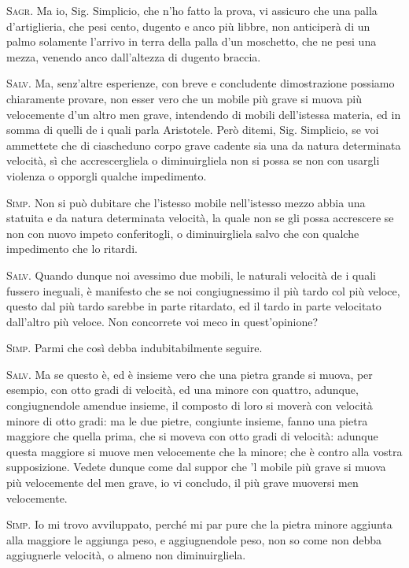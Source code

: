 \documentclass[11pt,twoside,openany]{book}
\newcommand{\speaker}[1]{\textcolor{rubric}{\textsc{#1}}\space}
\begin{document}
\speaker{Sagr.} Ma io, Sig. Simplicio, che n'ho fatto la prova, vi assicuro che una palla d'artiglieria, che pesi cento, dugento e anco più libbre, non anticiperà di un palmo solamente l'arrivo in terra della palla d'un moschetto, che ne pesi una mezza, venendo anco dall'altezza di dugento braccia.

\speaker{Salv.} Ma, senz'altre esperienze, con breve e concludente dimostrazione possiamo chiaramente provare, non esser vero che un mobile più grave si muova più velocemente d'un altro men grave, intendendo di mobili dell'istessa materia, ed in somma di quelli de i quali parla Aristotele. Però ditemi, Sig. Simplicio, se voi ammettete che di ciascheduno corpo grave cadente sia una da natura determinata velocità, sì che accrescergliela o diminuirgliela non si possa se non con usargli violenza o opporgli qualche impedimento.

\speaker{Simp.} Non si può dubitare che l'istesso mobile nell'istesso mezzo abbia una statuita e da natura determinata velocità, la quale non se gli possa accrescere se non con nuovo impeto conferitogli, o diminuirgliela salvo che con qualche impedimento che lo ritardi.

\speaker{Salv.} Quando dunque noi avessimo due mobili, le naturali velocità de i quali fussero ineguali, è manifesto che se noi congiugnessimo il più tardo col più veloce, questo dal più tardo sarebbe in parte ritardato, ed il tardo in parte velocitato dall'altro più veloce. Non concorrete voi meco in quest'opinione?

\speaker{Simp.} Parmi che così debba indubitabilmente seguire.

\speaker{Salv.} Ma se questo è, ed è insieme vero che una pietra grande si muova, per esempio, con otto gradi di velocità, ed una minore con quattro, adunque, congiugnendole amendue insieme, il composto di loro si moverà con velocità minore di otto gradi: ma le due pietre, congiunte insieme, fanno una pietra maggiore che quella prima, che si moveva con otto gradi di velocità: adunque questa maggiore si muove men velocemente che la minore; che è contro alla vostra supposizione. Vedete dunque come dal suppor che 'l mobile più grave si muova più velocemente del men grave, io vi concludo, il più grave muoversi men velocemente.

\speaker{Simp.} Io mi trovo avviluppato, perché mi par pure che la pietra minore aggiunta alla maggiore le aggiunga peso, e aggiugnendole peso, non so come non debba aggiugnerle velocità, o almeno non diminuirgliela.
\end{document}

